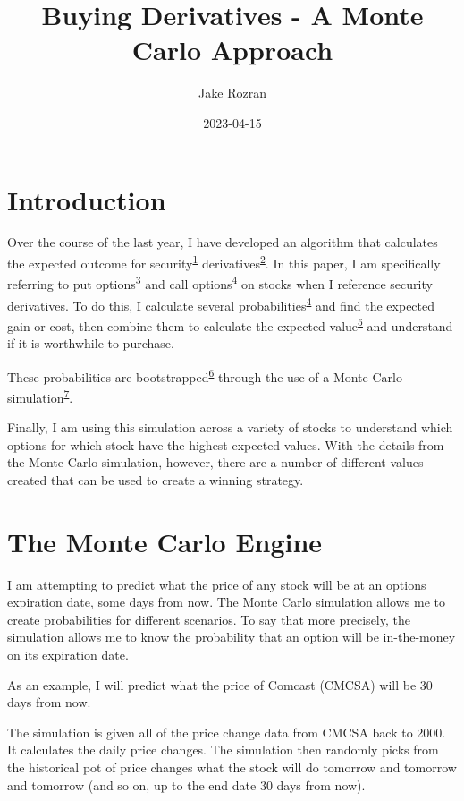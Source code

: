 \documentclass[
]{book}
\title{Buying Derivatives - A Monte Carlo Approach}
\author{Jake Rozran}
\date{2023-04-15}
\begin{document}
\maketitle

{
\setcounter{tocdepth}{1}
\tableofcontents
}
\hypertarget{intro}{%
\chapter{Introduction}\label{intro}}

Over the course of the last year, I have developed an algorithm that calculates
the expected outcome for security\textsuperscript{\protect\hyperlink{def}{1}} derivatives\textsuperscript{\protect\hyperlink{def}{2}}. In this
paper, I am specifically referring to put options\textsuperscript{\protect\hyperlink{def}{3}} and call
options\textsuperscript{\protect\hyperlink{def}{4}} on stocks when I reference security derivatives. To do this,
I calculate several probabilities\textsuperscript{\protect\hyperlink{def}{4}} and find the expected gain or cost,
then combine them to calculate the expected value\textsuperscript{\protect\hyperlink{def}{5}} and understand if
it is worthwhile to purchase.

These probabilities are bootstrapped\textsuperscript{\protect\hyperlink{def}{6}} through the use of a Monte Carlo
simulation\textsuperscript{\protect\hyperlink{def}{7}}.

Finally, I am using this simulation across a variety of stocks to understand
which options for which stock have the highest expected values. With the details
from the Monte Carlo simulation, however, there are a number of different values
created that can be used to create a winning strategy.

\hypertarget{mc}{%
\chapter{The Monte Carlo Engine}\label{mc}}

I am attempting to predict what the price of any stock will be at an options
expiration date, some days from now. The Monte Carlo simulation allows me to
create probabilities for different scenarios. To say that more precisely, the
simulation allows me to know the probability that an option will be in-the-money
on its expiration date.

As an example, I will predict what the price of Comcast (CMCSA) will be 30 days
from now.

The simulation is given all of the price change data from CMCSA back to 2000. It
calculates the daily price changes. The simulation then randomly picks from the
historical pot of price changes what the stock will do tomorrow and tomorrow and
tomorrow (and so on, up to the end date 30 days from now).
\end{document}
